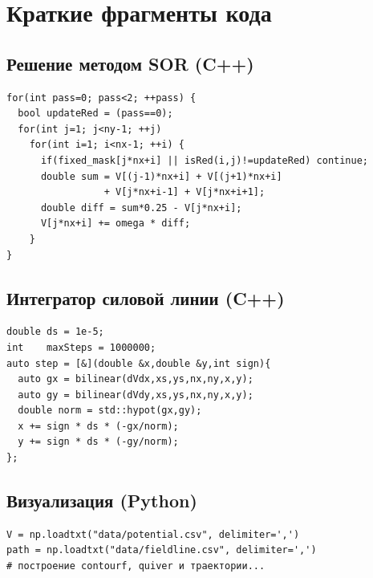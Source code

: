 \documentclass[12pt]{article}
\begin{document}
\section*{Краткие фрагменты кода}
\subsection*{Решение методом SOR (C++)}
\begin{verbatim}
for(int pass=0; pass<2; ++pass) {
  bool updateRed = (pass==0);
  for(int j=1; j<ny-1; ++j)
    for(int i=1; i<nx-1; ++i) {
      if(fixed_mask[j*nx+i] || isRed(i,j)!=updateRed) continue;
      double sum = V[(j-1)*nx+i] + V[(j+1)*nx+i]
                 + V[j*nx+i-1] + V[j*nx+i+1];
      double diff = sum*0.25 - V[j*nx+i];
      V[j*nx+i] += omega * diff;
    }
}
\end{verbatim}

\subsection*{Интегратор силовой линии (C++)}
\begin{verbatim}
double ds = 1e-5;
int    maxSteps = 1000000;
auto step = [&](double &x,double &y,int sign){
  auto gx = bilinear(dVdx,xs,ys,nx,ny,x,y);
  auto gy = bilinear(dVdy,xs,ys,nx,ny,x,y);
  double norm = std::hypot(gx,gy);
  x += sign * ds * (-gx/norm);
  y += sign * ds * (-gy/norm);
};
\end{verbatim}

\subsection*{Визуализация (Python)}
\begin{verbatim}
V = np.loadtxt("data/potential.csv", delimiter=',')
path = np.loadtxt("data/fieldline.csv", delimiter=',')
# построение contourf, quiver и траектории...
\end{verbatim}

\end{document}
